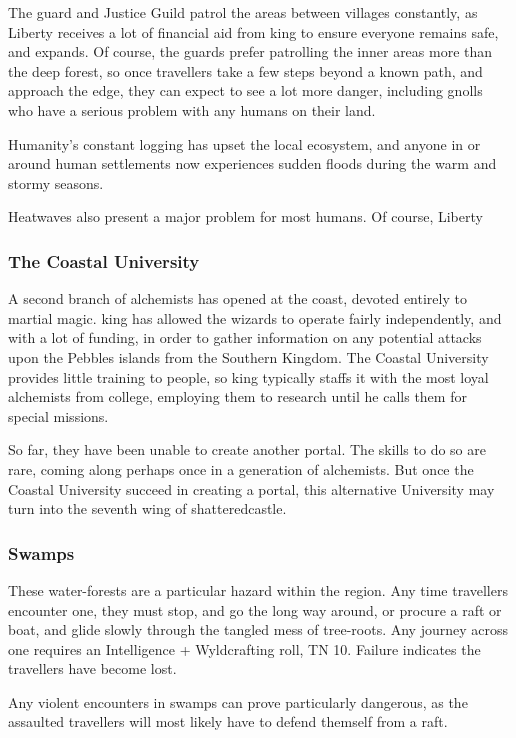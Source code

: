 \begin{multicols}{2}
The \gls{guard} and Justice Guild patrol the areas between villages constantly, as Liberty receives a lot of financial aid from \gls{king} to ensure everyone remains safe, and expands.
Of course, the \glspl{guard} prefer patrolling the inner areas more than the deep forest, so once travellers take a few steps beyond a known path, and approach the \gls{edge}, they can expect to see a lot more danger, including gnolls who have a serious problem with any humans on their land.

Humanity's constant logging has upset the local ecosystem, and anyone in or around human settlements now experiences sudden floods during the warm and stormy seasons.

Heatwaves also present a major problem for most humans.
Of course, Liberty


\subsubsection{The Coastal University}

A second branch of \gls{alchemists} has opened at the coast, devoted entirely to martial magic.
\Gls{king} has allowed the wizards to operate fairly independently, and with a lot of funding, in order to gather information on any potential attacks upon the Pebbles islands from the Southern Kingdom.
The Coastal University provides little training to people, so \gls{king} typically staffs it with the most loyal alchemists from \gls{college}, employing them to research until he calls them for special missions.

So far, they have been unable to create another portal.
The skills to do so are rare, coming along perhaps once in a generation of alchemists.
But once the Coastal University succeed in creating a portal, this alternative University may turn into the seventh wing of \gls{shatteredcastle}.

\subsubsection{Swamps}

These water-forests are a particular hazard within the region.
Any time travellers encounter one, they must stop, and go the long way around, or procure a raft or boat, and glide slowly through the tangled mess of tree-roots.
Any journey across one requires an Intelligence + Wyldcrafting roll, TN 10.
Failure indicates the travellers have become lost.

Any violent encounters in swamps can prove particularly dangerous, as the assaulted travellers will most likely have to defend themself from a raft.


\end{multicols}
